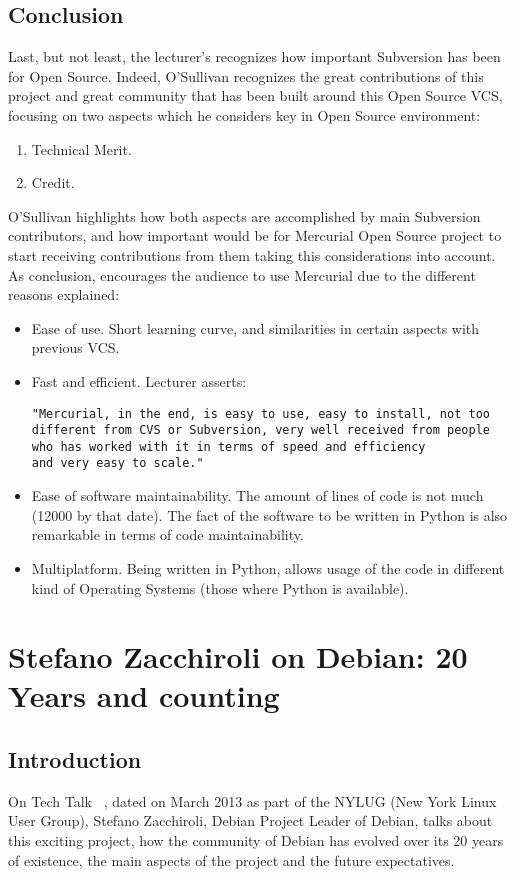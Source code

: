 \documentclass[11pt]{article}
\begin{document}
\subsection{Conclusion}
Last, but not least, the lecturer's recognizes how important Subversion has been for Open Source. Indeed, O'Sullivan recognizes the great contributions of this project and great community that has been built around this Open Source VCS, focusing on two aspects which he considers key in Open Source environment:
\begin{enumerate}
\item{Technical Merit}.
\item{Credit}.
\end{enumerate}
O'Sullivan highlights how both aspects are accomplished by main Subversion contributors, and how important would be for Mercurial Open Source project to start receiving contributions from them taking this considerations into account.
As conclusion, encourages the audience to use Mercurial due to the different reasons explained:
\begin{itemize}\itemsep0pt
\item{Ease of use}. Short learning curve, and similarities in certain aspects with previous VCS.
\item{Fast and efficient}. Lecturer asserts:
\begin{verbatim}
"Mercurial, in the end, is easy to use, easy to install, not too
different from CVS or Subversion, very well received from people
who has worked with it in terms of speed and efficiency
and very easy to scale."
\end{verbatim}
\item{Ease of software maintainability}. The amount of lines of code is not much (12000 by that date). The fact of the software to be written in Python is also remarkable in terms of code maintainability.
\item{Multiplatform}. Being written in Python, allows usage of the code in different kind of Operating Systems (those where Python is available).
\end{itemize}

\pagebreak

\section{Stefano Zacchiroli on Debian: 20 Years and counting}
\label{sec:debian20years}
\subsection{Introduction}
On Tech Talk ~\cite{TALK06}, dated on March 2013 as part of the NYLUG (New York Linux User Group), Stefano Zacchiroli, Debian Project Leader of Debian, talks about this exciting project, how the community of Debian has evolved over its 20 years of existence, the main aspects of the project and the future expectatives. 
\end{document}
